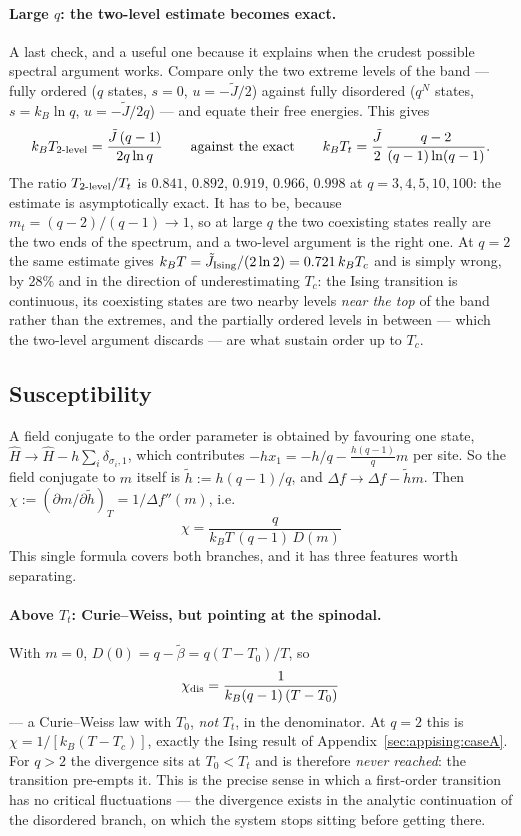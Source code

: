 \documentclass[10pt,a4paper]{article}
\theoremstyle{remark}
\begin{document}
\paragraph{Large $q$: the two-level estimate becomes exact.} A last check, and a
useful one because it explains when the crudest possible spectral argument works.
Compare only the two extreme levels of the band --- fully ordered ($q$ states,
$s=0$, $u=-\tilde J/2$) against fully disordered ($q^{N}$ states, $s=k_B\ln q$,
$u=-\tilde J/2q$) --- and equate their free energies. This gives
\begin{equation}\label{eq:ptspec_twolevel}
k_BT_{\rm 2\text{-}level}=\frac{\tilde J\,(q-1)}{2q\ln q}
\qquad\text{against the exact}\qquad
k_BT_t=\frac{\tilde J}{2}\,\frac{q-2}{(q-1)\ln(q-1)} .
\end{equation}
The ratio $T_{\rm 2\text{-}level}/T_t$ is $0.841$, $0.892$, $0.919$, $0.966$,
$0.998$ at $q=3,4,5,10,100$: the estimate is asymptotically exact. It has to be,
because $m_t=(q-2)/(q-1)\to1$, so at large $q$ the two coexisting states really
are the two ends of the spectrum, and a two-level argument is the right one. At
$q=2$ the same estimate gives $k_BT=\tilde J_{\rm Ising}/(2\ln2)=0.721\,k_BT_c$
and is simply wrong, by $28\%$ and in the direction of underestimating $T_c$:
the Ising transition is continuous, its coexisting states are two nearby levels
\emph{near the top} of the band rather than the extremes, and the partially
ordered levels in between --- which the two-level argument discards --- are what
sustain order up to $T_c$.

\subsection{Susceptibility}
\label{sec:apppotts:chi}

A field conjugate to the order parameter is obtained by favouring one state,
$\hat H\to\hat H-h\sum_i\delta_{\sigma_i,1}$, which contributes $-hx_1=
-h/q-\frac{h(q-1)}{q}m$ per site. So the field conjugate to $m$ itself is
$\tilde h:= h(q-1)/q$, and $\Delta f\to\Delta f-\tilde h m$. Then
$\chi:=(\partial m/\partial\tilde h)_T=1/\Delta f''(m)$, i.e.
\[
\;
\chi=\frac{q}{k_BT\,(q-1)\,D(m)}\
\]
This single formula covers both branches, and it has three features worth
separating.

\paragraph{Above $T_t$: Curie--Weiss, but pointing at the spinodal.} With $m=0$,
$D(0)=q-\tilde\beta=q(T-T_0)/T$, so
\[
\;
\chi_{\rm dis}=\frac{1}{k_B(q-1)\,(T-T_0)}\
\]
--- a Curie--Weiss law with $T_0$, \emph{not} $T_t$, in the denominator. At $q=2$
this is $\chi=1/[k_B(T-T_c)]$, exactly the Ising result of
Appendix~\ref{sec:appising:caseA}. For $q>2$ the divergence sits at $T_0<T_t$ and
is therefore \emph{never reached}: the transition pre-empts it. This is the
precise sense in which a first-order transition has no critical fluctuations ---
the divergence exists in the analytic continuation of the disordered branch, on
which the system stops sitting before getting there.
\end{document}
